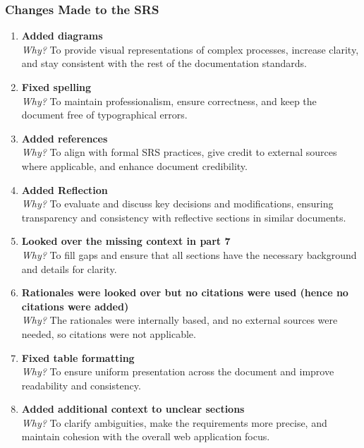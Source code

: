 \documentclass{article}
\begin{document}
\subsubsection{Changes Made to the SRS}
\begin{enumerate}
    \item \textbf{Added diagrams} \\
    \textit{Why?} To provide visual representations of complex processes, increase clarity, and stay consistent with the rest of the documentation standards.

    \item \textbf{Fixed spelling} \\
    \textit{Why?} To maintain professionalism, ensure correctness, and keep the document free of typographical errors.

    \item \textbf{Added references} \\
    \textit{Why?} To align with formal SRS practices, give credit to external sources where applicable, and enhance document credibility.

    \item \textbf{Added Reflection} \\
    \textit{Why?} To evaluate and discuss key decisions and modifications, ensuring transparency and consistency with reflective sections in similar documents.

    \item \textbf{Looked over the missing context in part 7} \\
    \textit{Why?} To fill gaps and ensure that all sections have the necessary background and details for clarity.

    \item \textbf{Rationales were looked over but no citations were used (hence no citations were added)} \\
    \textit{Why?} The rationales were internally based, and no external sources were needed, so citations were not applicable.

    \item \textbf{Fixed table formatting} \\
    \textit{Why?} To ensure uniform presentation across the document and improve readability and consistency.

    \item \textbf{Added additional context to unclear sections} \\
    \textit{Why?} To clarify ambiguities, make the requirements more precise, and maintain cohesion with the overall web application focus.


\end{enumerate}
\end{document}
